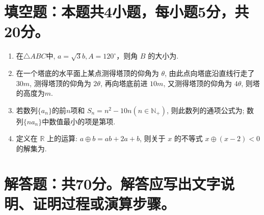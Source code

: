 \documentclass[17pt,twoside,space]{ctexart}
\begin{document}
\section{填空题：本题共4小题，每小题5分，共20分。}

\begin{enumerate}[itemsep=-0.3em,topsep=0pt,resume]%

\item 在$\triangle ABC$中, $a = \sqrt{3}b, A=120^\circ$，则角 $B$ 的大小为\blank. 

\item 在一个塔底的水平面上某点测得塔顶的仰角为 $\theta$, 由此点向塔底沿直线行走了 $30m$, 测得塔顶的仰角为 $2\theta$, 再向塔底前进 $10m$, 又测得塔顶的仰角为 $4\theta$, 则塔的高度为\blank $m$.


\item 若数列$\{a_n\}$的前$n$项和 $S_n = n^2-10n (n\in \mathbb{N}_+)$, 则此数列的通项公式为\blank ; 数列$\{na_n\}$中数值最小的项是第\blank 项. 

\item 定义在 $\mathbb{R}$ 上的运算: $a \oplus b = ab+2a+b$, 则关于 $x$ 的不等式 $x \oplus (x-2) < 0$ 的解集为\blank . 

\end{enumerate}


\section{解答题：共70分。解答应写出文字说明、证明过程或演算步骤。}
\end{document}
